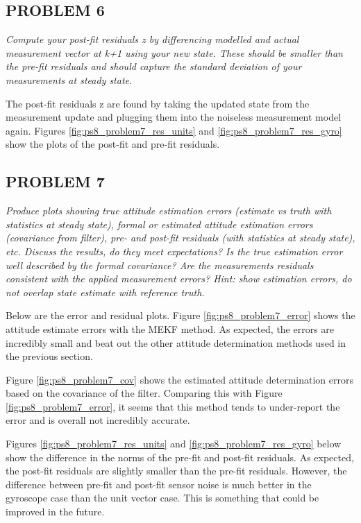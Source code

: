 \subsection{PROBLEM 6}
\textit{Compute your post-fit residuals z by differencing modelled and actual measurement vector at k+1 using your new state. These should be smaller than the pre-fit residuals and should capture the standard deviation of your measurements at steady state.}

The post-fit residuals z are found by taking the updated state from the measurement update and plugging them into the noiseless measurement model again. Figures \ref{fig:ps8_problem7_res_units} and \ref{fig:ps8_problem7_res_gyro} show the plots of the post-fit and pre-fit residuals.

\subsection{PROBLEM 7}
\textit{Produce plots showing true attitude estimation errors (estimate vs truth with statistics at steady state), formal or estimated attitude estimation errors (covariance from filter), pre- and post-fit residuals (with statistics at steady state), etc. Discuss the results, do they meet expectations? Is the true estimation error well described by the formal covariance? Are the measurements residuals consistent with the applied measurement errors? Hint: show estimation errors, do not overlap state estimate with reference truth.}

Below are the error and residual plots. Figure \ref{fig:ps8_problem7_error} shows the attitude estimate errors with the MEKF method. As expected, the errors are incredibly small and beat out the other attitude determination methods used in the previous section.

Figure \ref{fig:ps8_problem7_cov} shows the estimated attitude determination errors based on the covariance of the filter. Comparing this with Figure \ref{fig:ps8_problem7_error}, it seems that this method tends to under-report the error and is overall not incredibly accurate.

Figures \ref{fig:ps8_problem7_res_units} and \ref{fig:ps8_problem7_res_gyro} below show the difference in the norms of the pre-fit and post-fit residuals. As expected, the post-fit residuals are slightly smaller than the pre-fit residuals. However, the difference between pre-fit and post-fit sensor noise is much better in the gyroscope case than the unit vector case. This is something that could be improved in the future.

